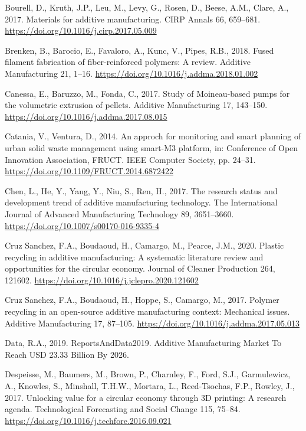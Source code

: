 \documentclass[
  11pt,
]{article}
\newlength{\cslhangindent}
\newlength{\cslentryspacingunit} %
\newenvironment{CSLReferences}[2] %
 {%
  \setlength{\parindent}{0pt}
  \ifodd #1
  \let\oldpar\par
  \def\par{\hangindent=\cslhangindent\oldpar}
  \fi
  \setlength{\parskip}{#2\cslentryspacingunit}
 }%
 {}
\begin{document}
\begin{CSLReferences}{1}{0}
\leavevmode{}%
Bourell, D., Kruth, J.P., Leu, M., Levy, G., Rosen, D., Beese, A.M.,
Clare, A., 2017. Materials for additive manufacturing. CIRP Annals 66,
659--681. \url{https://doi.org/10.1016/j.cirp.2017.05.009}

\leavevmode{}%
Brenken, B., Barocio, E., Favaloro, A., Kunc, V., Pipes, R.B., 2018.
Fused filament fabrication of fiber-reinforced polymers: {A} review.
Additive Manufacturing 21, 1--16.
\url{https://doi.org/10.1016/j.addma.2018.01.002}

\leavevmode{}%
Canessa, E., Baruzzo, M., Fonda, C., 2017. Study of {Moineau-based}
pumps for the volumetric extrusion of pellets. Additive Manufacturing
17, 143--150. \url{https://doi.org/10.1016/j.addma.2017.08.015}

\leavevmode{}%
Catania, V., Ventura, D., 2014. An approch for monitoring and smart
planning of urban solid waste management using smart-{M3} platform, in:
Conference of {Open Innovation Association}, {FRUCT}. {IEEE Computer
Society}, pp. 24--31. \url{https://doi.org/10.1109/FRUCT.2014.6872422}

\leavevmode{}%
Chen, L., He, Y., Yang, Y., Niu, S., Ren, H., 2017. The research status
and development trend of additive manufacturing technology. The
International Journal of Advanced Manufacturing Technology 89,
3651--3660. \url{https://doi.org/10.1007/s00170-016-9335-4}

\leavevmode{}%
Cruz Sanchez, F.A., Boudaoud, H., Camargo, M., Pearce, J.M., 2020.
Plastic recycling in additive manufacturing: {A} systematic literature
review and opportunities for the circular economy. Journal of Cleaner
Production 264, 121602.
\url{https://doi.org/10.1016/j.jclepro.2020.121602}

\leavevmode{}%
Cruz Sanchez, F.A., Boudaoud, H., Hoppe, S., Camargo, M., 2017. Polymer
recycling in an open-source additive manufacturing context: {Mechanical}
issues. Additive Manufacturing 17, 87--105.
\url{https://doi.org/10.1016/j.addma.2017.05.013}

\leavevmode{}%
Data, R.A., 2019. {ReportsAndData2019}. Additive Manufacturing Market To
Reach USD 23.33 Billion By 2026.

\leavevmode{}%
Despeisse, M., Baumers, M., Brown, P., Charnley, F., Ford, S.J.,
Garmulewicz, A., Knowles, S., Minshall, T.H.W., Mortara, L.,
Reed-Tsochas, F.P., Rowley, J., 2017. Unlocking value for a circular
economy through {3D} printing: {A} research agenda. Technological
Forecasting and Social Change 115, 75--84.
\url{https://doi.org/10.1016/j.techfore.2016.09.021}


\end{CSLReferences}
\end{document}
